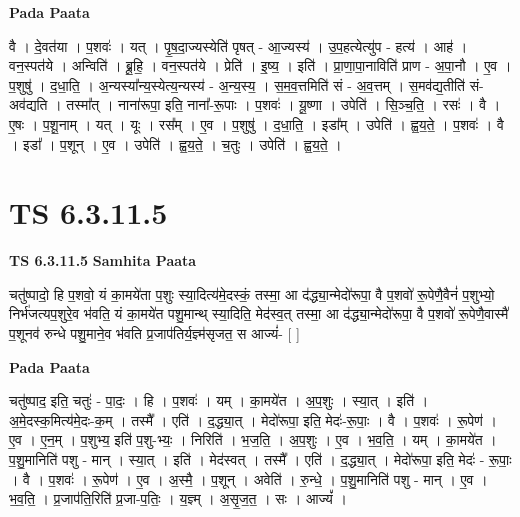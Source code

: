 \documentclass[17pt]{extarticle}
\begin{document}
\textbf{Pada Paata} \newline

वै । दे॒वत॑या । प॒शवः॑ । यत् । पृ॒ष॒दा॒ज्यस्येति॑ पृषत् - आ॒ज्यस्य॑ । उ॒प॒हत्येत्यु॑प - हत्य॑ । आह॑ । वन॒स्पत॑ये । अन्विति॑ । ब्रू॒हि॒ । वन॒स्पत॑ये । प्रेति॑ । इ॒ष्य॒ । इति॑ । प्रा॒णा॒पा॒नाविति॑ प्राण - अ॒पा॒नौ । ए॒व । प॒शुषु॑ । द॒धा॒ति॒ । अ॒न्यस्या᳚न्य॒स्येत्य॒न्यस्य॑ - अ॒न्य॒स्य॒ । स॒म॒व॒त्तमिति॑ सं - अ॒व॒त्तम् । स॒मव॑द्य॒तीति॑ सं-अव॑द्यति । तस्मा᳚त् । नाना॑रूपा॒ इति॒ नाना᳚-रू॒पाः । प॒शवः॑ । यू॒ष्णा । उपेति॑ । सि॒ञ्च॒ति॒ । रसः॑ । वै । ए॒षः । प॒शू॒नाम् । यत् । यूः । रस᳚म् । ए॒व । प॒शुषु॑ । द॒धा॒ति॒ । इडा᳚म् । उपेति॑ । ह्व॒य॒ते॒ । प॒शवः॑ । वै । इडा᳚ । प॒शून् । ए॒व । उपेति॑ । ह्व॒य॒ते॒ । च॒तुः । उपेति॑ । ह्व॒य॒ते॒ ।  \newline




\section*{ TS 6.3.11.5 }

\textbf{TS 6.3.11.5 } \newline
\textbf{Samhita Paata} \newline

चतु॑ष्पादो॒ हि प॒शवो॒ यं का॒मये॑ता प॒शुः स्या॒दित्य॑मे॒दस्कं॒ तस्मा॒ आ द॑द्ध्या॒न्मेदो॑रूपा॒ वै प॒शवो॑ रू॒पेणै॒वैनं॑ प॒शुभ्यो॒ निर्भ॑जत्यप॒शुरे॒व भ॑वति॒ यं का॒मये॑त पशु॒मान्थ् स्या॒दिति॒ मेद॑स्व॒त् तस्मा॒ आ द॑द्ध्या॒न्मेदो॑रूपा॒ वै प॒शवो॑ रू॒पेणै॒वास्मै॑ प॒शूनव॑ रुन्धे पशु॒माने॒व भ॑वति प्र॒जाप॑तिर्य॒ज्ञ्म॑सृजत॒ स आज्यं॑- [  ] \newline

\textbf{Pada Paata} \newline

चतु॑ष्पाद॒ इति॒ चतुः॑ - पा॒दः॒ । हि । प॒शवः॑ । यम् । का॒मये॑त । अ॒प॒शुः । स्या॒त् । इति॑ । अ॒मे॒दस्क॒मित्य॑मे॒दः-क॒म् । तस्मै᳚ । एति॑ । द॒द्ध्या॒त् । मेदो॑रूपा॒ इति॒ मेदः॑-रू॒पाः॒ । वै । प॒शवः॑ । रू॒पेण॑ । ए॒व । ए॒न॒म् । प॒शुभ्य॒ इति॑ प॒शु-भ्यः॒ । निरिति॑ । भ॒ज॒ति॒ । अ॒प॒शुः । ए॒व । भ॒व॒ति॒ । यम् । का॒मये॑त । प॒शु॒मानिति॑ पशु - मान् । स्या॒त् । इति॑ । मेद॑स्वत् । तस्मै᳚ । एति॑ । द॒द्ध्या॒त् । मेदो॑रूपा॒ इति॒ मेदः॑ - रू॒पाः॒ । वै । प॒शवः॑ । रू॒पेण॑ । ए॒व । अ॒स्मै॒ । प॒शून् । अवेति॑ । रु॒न्धे॒ । प॒शु॒मानिति॑ पशु - मान् । ए॒व । भ॒व॒ति॒ । प्र॒जाप॑ति॒रिति॑ प्र॒जा-प॒तिः॒ । य॒ज्ञ्म् । अ॒सृ॒ज॒त॒ । सः । आज्यं᳚ ।  \newline
\end{document}
